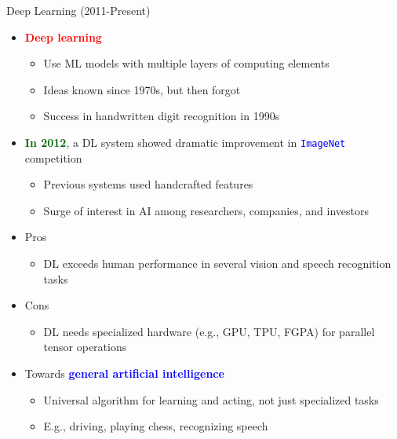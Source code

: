 \documentclass[
  10pt,
  ignorenonframetext,
]{beamer}
\providecommand{\tightlist}{%
  \setlength{\itemsep}{0pt}\setlength{\parskip}{0pt}}
\begin{document}
\begin{frame}{Deep Learning (2011-Present)}
\label{deep-learning-2011-present}
\begin{itemize}
\tightlist
\item
  \textbf{\textcolor{red}{Deep learning}}

  \begin{itemize}
  \tightlist
  \item
    Use ML models with multiple layers of computing elements
  \item
    Ideas known since 1970s, but then forgot
  \item
    Success in handwritten digit recognition in 1990s
  \end{itemize}
\item
  \textbf{\textcolor{darkgreen}{In 2012}}, a DL system showed dramatic
  improvement in \textcolor{blue}{\texttt{ImageNet}} competition

  \begin{itemize}
  \tightlist
  \item
    Previous systems used handcrafted features
  \item
    Surge of interest in AI among researchers, companies, and investors
  \end{itemize}
\item
  Pros

  \begin{itemize}
  \tightlist
  \item
    DL exceeds human performance in several vision and speech
    recognition tasks
  \end{itemize}
\item
  Cons

  \begin{itemize}
  \tightlist
  \item
    DL needs specialized hardware (e.g., GPU, TPU, FGPA) for parallel
    tensor operations
  \end{itemize}
\item
  Towards \textbf{\textcolor{blue}{general artificial intelligence}}

  \begin{itemize}
  \tightlist
  \item
    Universal algorithm for learning and acting, not just specialized
    tasks
  \item
    E.g., driving, playing chess, recognizing speech
  \end{itemize}
\end{itemize}
\end{frame}
\end{document}
